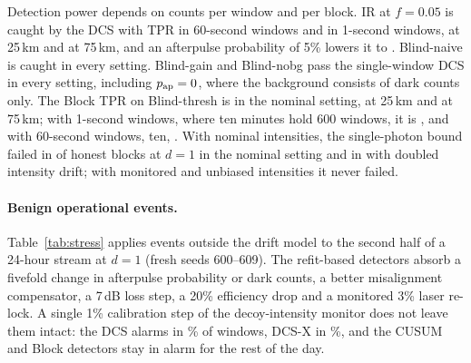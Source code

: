 Detection power depends on counts per window and per block. IR at $f=0.05$ is caught by the DCS with TPR \sensWinSixtyIrFive{} in 60-second windows and \sensWinOneIrFive{} in 1-second windows, \sensLenTwentyFiveIrFive{} at 25\,km and \sensLenSeventyFiveIrFive{} at 75\,km, and an afterpulse probability of 5\% lowers it to \sensApFiveIrFive. Blind-naive is caught in every setting. Blind-gain and Blind-nobg pass the single-window DCS in every setting, including $p_{\rm ap}=0$, where the background consists of dark counts only. The Block TPR on Blind-thresh is \sensNomBlockThresh{} in the nominal setting, \sensLenTwentyFiveBlockThresh{} at 25\,km and \sensLenSeventyFiveBlockThresh{} at 75\,km; with 1-second windows, where ten minutes hold 600 windows, it is \sensWinOneBlockThresh, and with 60-second windows, ten, \sensWinSixtyBlockThresh. With nominal intensities, the single-photon bound failed in \sensNomViolNom{} of \sensNblocks{} honest blocks at $d=1$ in the nominal setting and in \sensIdTwoViolNom{} with doubled intensity drift; with monitored and unbiased intensities it never failed.

\paragraph{Benign operational events.} Table~\ref{tab:stress} applies events outside the drift model to the second half of a 24-hour stream at $d=1$ (fresh seeds 600--609). The refit-based detectors absorb a fivefold change in afterpulse probability or dark counts, a better misalignment compensator, a 7\,dB loss step, a 20\% efficiency drop and a monitored 3\% laser re-lock. A single 1\% calibration step of the decoy-intensity monitor does not leave them intact: the DCS alarms in \stressMonDCS\% of windows, DCS-X in \stressMonDCSX\%, and the CUSUM and Block detectors stay in alarm for the rest of the day.

